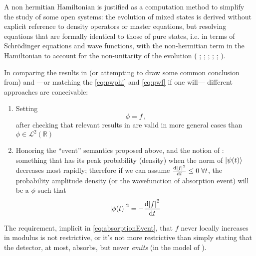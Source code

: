 A non hermitian Hamiltonian is justified as a computation method
to simplify the study of some open systems: the evolution of mixed
states is derived without explicit reference to density operators
or master equations, but resolving equations that are formally
identical to those of pure states,
i.e. in terms of
Schr{\"o}dinger equations and wave functions,
with the non-hermitian term in the Hamiltonian
to account for the non-unitarity of the evolution
(%
  \cite[Ch. 6]{TQM2};
  \cite{Wave-function_approach};
  \cite{HowToResetAnAtom};
  \cite{TheQuantumJumpApproach};
  \cite[\S 8.5 ``The `quantum jump' approach to damping'' and particularly \S 8.5.2 ``The wave function Monte Carlo approach to damping'']{ScullyZubairy};
  \cite[particularly \S 6.7.1 ``Simulating Quantum Trajectories'']{WallsMilburn}%
).

In comparing the results in (or attempting to draw some common conclusion from)
\cite{Lloyd:Time} and \cite{RuschhauptAbsorption}
---or matching the \eqref{eq:pwphi} and \eqref{eq:pwf} if one will---
different approaches are conceivable:
\begin{enumerate}
  \item
    Setting
    \begin{equation}
      \phi = f \, \text{,}
    \end{equation}
    after checking that relevant results in \cite{Lloyd:Time} are valid in more general cases than
    $\phi \in \mathcal{L}^2(\mathbb{R})$
  \item
    Honoring the ``event'' semantics proposed above, and the notion of :
    something that has its peak probability (density)
    when the norm of $\ket{\psi(t)}$ decreases most rapidly; therefore if we can assume
    $\dv{\abs{f}^2}{t} \leq 0 \; \forall t$, the probability amplitude density
    (or the wavefunction of absorption event) will be a $\phi$ such that
    \begin{equation}\label{eq:absorptionEvent}
      \abs{\phi(t)}^2 = -\dv{\abs{f}^2}{t}
    \end{equation} 
\end{enumerate}

The requirement, implicit  in \eqref{eq:absorptionEvent},
that $f$ never locally increases in modulus
is not restrictive, or it's not more restrictive than simply stating
that the detector, at most, absorbs, but never \emph{emits}
(in the model of \cite{RuschhauptAbsorption}).
